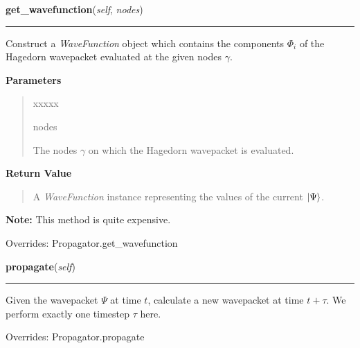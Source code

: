 \hspace{.8\funcindent}\begin{boxedminipage}{\funcwidth}

    \raggedright \textbf{get\_wavefunction}(\textit{self}, \textit{nodes})

    \vspace{-1.5ex}

    \rule{\textwidth}{0.5\fboxrule}
\setlength{\parskip}{2ex}
    Construct a \textit{WaveFunction} object which contains the components
    $\Phi_i$ of the Hagedorn wavepacket evaluated at the
    given nodes $\gamma$.

\setlength{\parskip}{1ex}
      \textbf{Parameters}
      \vspace{-1ex}

      \begin{quote}
        \begin{Ventry}{xxxxx}

          \item[nodes]

          The nodes $\gamma$ on which the Hagedorn
          wavepacket is evaluated.

        \end{Ventry}

      \end{quote}

      \textbf{Return Value}
    \vspace{-1ex}

      \begin{quote}
      A \textit{WaveFunction} instance representing the values of the
      current $\Ket{\Psi}$.

      \end{quote}

\textbf{Note:} This method is quite expensive.

      Overrides: Propagator.get\_wavefunction

    \end{boxedminipage}

    \vspace{0.5ex}

\hspace{.8\funcindent}\begin{boxedminipage}{\funcwidth}

    \raggedright \textbf{propagate}(\textit{self})

    \vspace{-1.5ex}

    \rule{\textwidth}{0.5\fboxrule}
\setlength{\parskip}{2ex}
    Given the wavepacket $\Psi$ at time $t$, calculate a
    new wavepacket at time $t + \tau$. We perform exactly one timestep
    $\tau$ here.

\setlength{\parskip}{1ex}

      Overrides: Propagator.propagate

    \end{boxedminipage}

